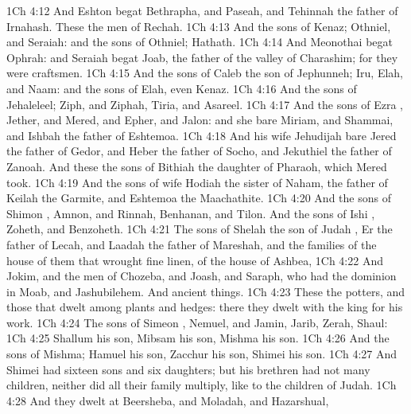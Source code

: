 \vs 1Ch 4:12 And Eshton begat Bethrapha, and Paseah, and Tehinnah the father of Irnahash. These  the men of Rechah.
\vs 1Ch 4:13 And the sons of Kenaz; Othniel, and Seraiah: and the sons of Othniel; Hathath.
\vs 1Ch 4:14 And Meonothai begat Ophrah: and Seraiah begat Joab, the father of the valley of Charashim; for they were craftsmen.
\vs 1Ch 4:15 And the sons of Caleb the son of Jephunneh; Iru, Elah, and Naam: and the sons of Elah, even Kenaz.
\vs 1Ch 4:16 And the sons of Jehaleleel; Ziph, and Ziphah, Tiria, and Asareel.
\vs 1Ch 4:17 And the sons of Ezra , Jether, and Mered, and Epher, and Jalon: and she bare Miriam, and Shammai, and Ishbah the father of Eshtemoa.
\vs 1Ch 4:18 And his wife Jehudijah bare Jered the father of Gedor, and Heber the father of Socho, and Jekuthiel the father of Zanoah. And these  the sons of Bithiah the daughter of Pharaoh, which Mered took.
\vs 1Ch 4:19 And the sons of  wife Hodiah the sister of Naham, the father of Keilah the Garmite, and Eshtemoa the Maachathite.
\vs 1Ch 4:20 And the sons of Shimon , Amnon, and Rinnah, Benhanan, and Tilon. And the sons of Ishi , Zoheth, and Benzoheth.
\vs 1Ch 4:21 The sons of Shelah the son of Judah , Er the father of Lecah, and Laadah the father of Mareshah, and the families of the house of them that wrought fine linen, of the house of Ashbea,
\vs 1Ch 4:22 And Jokim, and the men of Chozeba, and Joash, and Saraph, who had the dominion in Moab, and Jashubilehem. And  ancient things.
\vs 1Ch 4:23 These  the potters, and those that dwelt among plants and hedges: there they dwelt with the king for his work.
\vs 1Ch 4:24 The sons of Simeon , Nemuel, and Jamin, Jarib, Zerah,  Shaul:
\vs 1Ch 4:25 Shallum his son, Mibsam his son, Mishma his son.
\vs 1Ch 4:26 And the sons of Mishma; Hamuel his son, Zacchur his son, Shimei his son.
\vs 1Ch 4:27 And Shimei had sixteen sons and six daughters; but his brethren had not many children, neither did all their family multiply, like to the children of Judah.
\vs 1Ch 4:28 And they dwelt at Beersheba, and Moladah, and Hazarshual,
